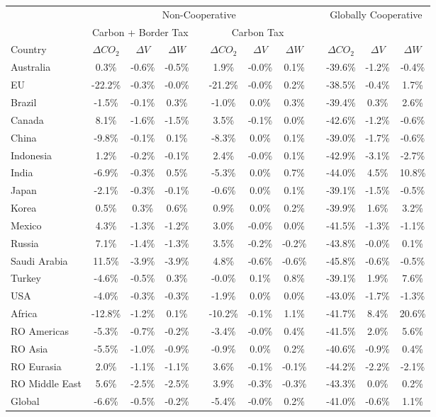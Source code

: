 \begin{tabular}{l ccc c ccc c ccc}
\toprule
& 
\multicolumn{7}{c}{Non-Cooperative} & &
\multicolumn{3}{c}{Globally Cooperative} \\
\cline{2-8}
& 
\multicolumn{3}{c}{Carbon + Border Tax} & &
\multicolumn{3}{c}{Carbon Tax} & &
\multicolumn{3}{c}{} \\
\cline{2-4}
\cline{6-8}
\cline{10-12}
Country &
$\Delta CO_2$ &
$\Delta V$ &
$\Delta W$ &&
$\Delta CO_2$ &
$\Delta V$ &
$\Delta W$ &&
$\Delta CO_2$ &
$\Delta V$ &
$\Delta W$ \\
\midrule
Australia & 0.3\% & -0.6\% & -0.5\% && 1.9\% & -0.0\% & 0.1\% && -39.6\% & -1.2\% & -0.4\% \\ EU & -22.2\% & -0.3\% & -0.0\% && -21.2\% & -0.0\% & 0.2\% && -38.5\% & -0.4\% & 1.7\% \\ Brazil & -1.5\% & -0.1\% & 0.3\% && -1.0\% & 0.0\% & 0.3\% && -39.4\% & 0.3\% & 2.6\% \\ Canada & 8.1\% & -1.6\% & -1.5\% && 3.5\% & -0.1\% & 0.0\% && -42.6\% & -1.2\% & -0.6\% \\ China & -9.8\% & -0.1\% & 0.1\% && -8.3\% & 0.0\% & 0.1\% && -39.0\% & -1.7\% & -0.6\% \\ Indonesia & 1.2\% & -0.2\% & -0.1\% && 2.4\% & -0.0\% & 0.1\% && -42.9\% & -3.1\% & -2.7\% \\ India & -6.9\% & -0.3\% & 0.5\% && -5.3\% & 0.0\% & 0.7\% && -44.0\% & 4.5\% & 10.8\% \\ Japan & -2.1\% & -0.3\% & -0.1\% && -0.6\% & 0.0\% & 0.1\% && -39.1\% & -1.5\% & -0.5\% \\ Korea & 0.5\% & 0.3\% & 0.6\% && 0.9\% & 0.0\% & 0.2\% && -39.9\% & 1.6\% & 3.2\% \\ Mexico & 4.3\% & -1.3\% & -1.2\% && 3.0\% & -0.0\% & 0.0\% && -41.5\% & -1.3\% & -1.1\% \\ Russia & 7.1\% & -1.4\% & -1.3\% && 3.5\% & -0.2\% & -0.2\% && -43.8\% & -0.0\% & 0.1\% \\ Saudi Arabia & 11.5\% & -3.9\% & -3.9\% && 4.8\% & -0.6\% & -0.6\% && -45.8\% & -0.6\% & -0.5\% \\ Turkey & -4.6\% & -0.5\% & 0.3\% && -0.0\% & 0.1\% & 0.8\% && -39.1\% & 1.9\% & 7.6\% \\ USA & -4.0\% & -0.3\% & -0.3\% && -1.9\% & 0.0\% & 0.0\% && -43.0\% & -1.7\% & -1.3\% \\ Africa & -12.8\% & -1.2\% & 0.1\% && -10.2\% & -0.1\% & 1.1\% && -41.7\% & 8.4\% & 20.6\% \\ RO Americas & -5.3\% & -0.7\% & -0.2\% && -3.4\% & -0.0\% & 0.4\% && -41.5\% & 2.0\% & 5.6\% \\ RO Asia & -5.5\% & -1.0\% & -0.9\% && -0.9\% & 0.0\% & 0.2\% && -40.6\% & -0.9\% & 0.4\% \\ RO Eurasia & 2.0\% & -1.1\% & -1.1\% && 3.6\% & -0.1\% & -0.1\% && -44.2\% & -2.2\% & -2.1\% \\ RO Middle East & 5.6\% & -2.5\% & -2.5\% && 3.9\% & -0.3\% & -0.3\% && -43.3\% & 0.0\% & 0.2\% \\  \addlinespace[2pt]
\midrule Global & -6.6\% & -0.5\% & -0.2\% && -5.4\% & -0.0\% & 0.2\% && -41.0\% & -0.6\% & 1.1\% \\  \bottomrule
\end{tabular}
